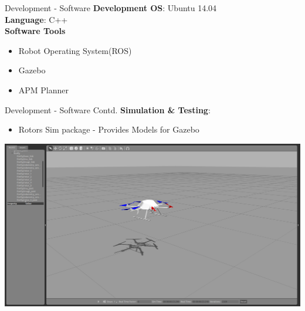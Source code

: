 \documentclass[11pt]{beamer}
\begin{document}
\begin{frame}{Development - Software}
\textbf{Development OS}: Ubuntu 14.04\\
\textbf{Language}: C++\\
\vspace{5mm}
\textbf{Software Tools}
\begin{itemize}
\item Robot Operating System(ROS)
\item Gazebo
\item APM Planner
\end{itemize}
\end{frame}


\begin{frame}{Development - Software Contd.}
\textbf{Simulation \& Testing}: 
\begin{itemize}
\item Rotors Sim package - Provides Models for Gazebo
\end{itemize}
\centerline{\includegraphics[scale=0.15]{images/Gazebo_Joy.png}}
\end{frame}
\end{document}
